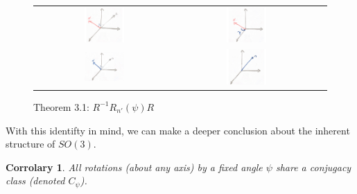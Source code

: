 \documentclass[10pt]{ucthesis}
\newtheorem{corrolary}[definition]{Corrolary}
\begin{document}
\begin{figure}[H]
	\centering

	\begin{tabular}{ccc}
		\includegraphics[width=0.3\textwidth]{RRnR1.png}
		&
		\includegraphics[width=0.3\textwidth]{RRnR2.png}\\
		\includegraphics[width=0.3\textwidth]{RRnR3.png}
		&
		\includegraphics[width=0.3\textwidth]{RRnR4.png}

	\end{tabular}
	\caption{Theorem 3.1: $R^{-1}R_{n'}(\psi)R$}
	

\end{figure}



With this identifty in mind, we can make a deeper conclusion about the inherent structure of $SO(3)$.

\begin{corrolary}
	All rotations (about any axis) by a fixed angle $\psi$ share a conjugacy class (denoted $C_\psi$).
\end{corrolary}
\end{document}
